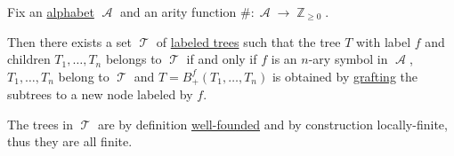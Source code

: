\begin{theorem}\label{thm:recursively_defined_abstract_syntax}
  Fix an \hyperref[def:formal_language/alphabet]{alphabet} \( \mscrA \) and an arity function \( \#: \mscrA \to \BbbZ_{\geq 0} \).

  Then there exists a set \( \mscrT \) of \hyperref[def:labeled_tree]{labeled trees} such that the tree \( T \) with label \( f \) and children \( T_1, \ldots, T_n \) belongs to \( \mscrT \) if and only if \( f \) is an \( n \)-ary symbol in \( \mscrA \), \( T_1, \ldots, T_n \) belong to \( \mscrT \) and \( T = B_+^f(T_1, \ldots, T_n) \) is obtained by \hyperref[def:ordered_tree_grafting]{grafting} the subtrees to a new node labeled by \( f \).
\end{theorem}
\begin{comments}
  \item The trees in \( \mscrT \) are by definition \hyperref[def:well_founded_graph]{well-founded} and by construction locally-finite, thus they are all finite.
\end{comments}
